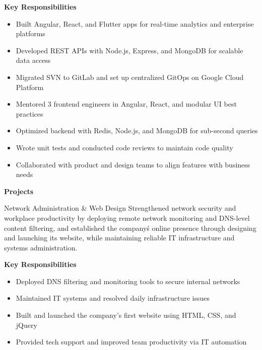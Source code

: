 \normalsize\textbf{Key Responsibilities}
\begin{itemize}[leftmargin=12pt,itemsep=0pt,topsep=4pt]
	\item \normalsize{Built Angular, React, and Flutter apps for real-time analytics and enterprise platforms}
	\item \normalsize{Developed REST APIs with Node.js, Express, and MongoDB for scalable data access}
	\item \normalsize{Migrated SVN to GitLab and set up centralized GitOps on Google Cloud Platform}
	\item \normalsize{Mentored 3 frontend engineers in Angular, React, and modular UI best practices}
	\item \normalsize{Optimized backend with Redis, Node.js, and MongoDB for sub-second queries}
	\item \normalsize{Wrote unit tests and conducted code reviews to maintain code quality}
	\item \normalsize{Collaborated with product and design teams to align features with business needs}
\end{itemize}\vspace*{12pt}


\normalsize\textbf{Projects}\vspace{4pt}
\begin{sectionContainer}
	{Network Administration \& Web Design} {Strengthened network security and workplace productivity by deploying remote network monitoring and DNS-level content filtering, and established the company\'s online presence through designing and launching its website, while maintaining reliable IT infrastructure and systems administration.}
\end{sectionContainer}

\normalsize\textbf{Key Responsibilities}
\begin{itemize}[leftmargin=12pt,itemsep=0pt,topsep=4pt]
	\item \normalsize{Deployed DNS filtering and monitoring tools to secure internal networks}
	\item \normalsize{Maintained IT systems and resolved daily infrastructure issues}
	\item \normalsize{Built and launched the company's first website using HTML, CSS, and jQuery}
	\item \normalsize{Provided tech support and improved team productivity via IT automation}
\end{itemize}\vspace*{12pt}

\nopagebreak[4]